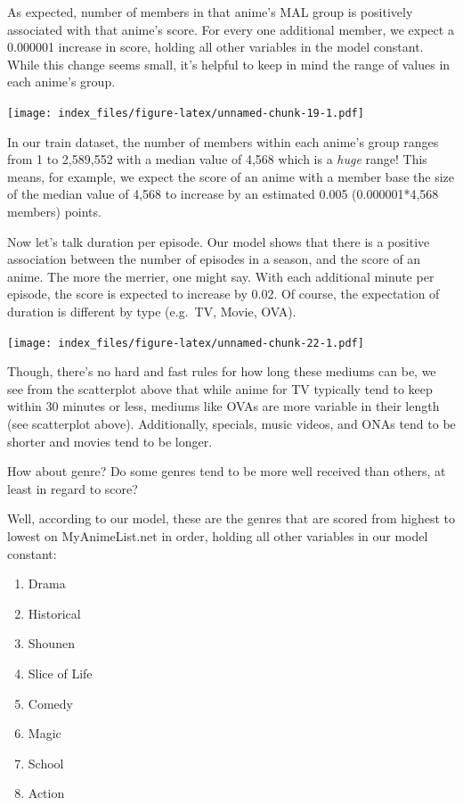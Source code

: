 \documentclass[
]{article}
\begin{document}
As expected, number of members in that anime's MAL group is positively
associated with that anime's score. For every one additional member, we
expect a 0.000001 increase in score, holding all other variables in the
model constant. While this change seems small, it's helpful to keep in
mind the range of values in each anime's group.

\texttt{[image: index\_files/figure-latex/unnamed-chunk-19-1.pdf]}

In our train dataset, the number of members within each anime's group
ranges from 1 to 2,589,552 with a median value of 4,568 which is a
\emph{huge} range! This means, for example, we expect the score of an
anime with a member base the size of the median value of 4,568 to
increase by an estimated 0.005 (0.000001*4,568 members) points.

Now let's talk duration per episode. Our model shows that there is a
positive association between the number of episodes in a season, and the
score of an anime. The more the merrier, one might say. With each
additional minute per episode, the score is expected to increase by
0.02. Of course, the expectation of duration is different by type
(e.g.~TV, Movie, OVA).

\texttt{[image: index\_files/figure-latex/unnamed-chunk-22-1.pdf]}

Though, there's no hard and fast rules for how long these mediums can
be, we see from the scatterplot above that while anime for TV typically
tend to keep within 30 minutes or less, mediums like OVAs are more
variable in their length (see scatterplot above). Additionally,
specials, music videos, and ONAs tend to be shorter and movies tend to
be longer.

How about genre? Do some genres tend to be more well received than
others, at least in regard to score?

Well, according to our model, these are the genres that are scored from
highest to lowest on MyAnimeList.net in order, holding all other
variables in our model constant:

\begin{enumerate}
\def\labelenumi{\arabic{enumi})}
\item
  Drama
\item
  Historical
\item
  Shounen
\item
  Slice of Life
\item
  Comedy
\item
  Magic
\item
  School
\item
  Action
\end{enumerate}
\end{document}
